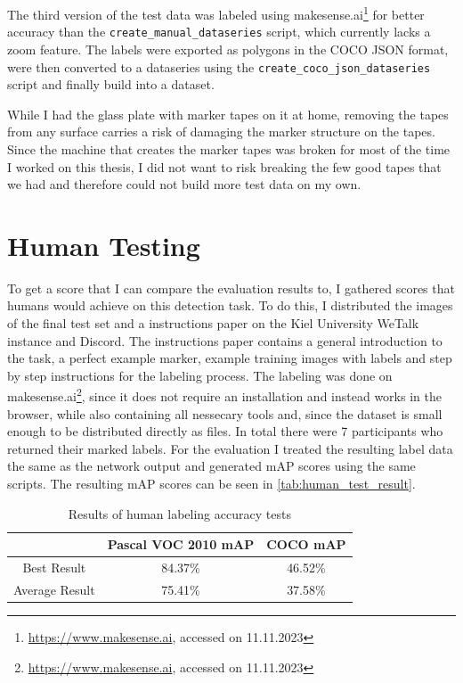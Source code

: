 \documentclass[10pt]{book}
\begin{document}
The third version of the test data was labeled using makesense.ai\footnote{\url{https://www.makesense.ai}, accessed on 11.11.2023} for better accuracy than the \texttt{create\_manual\_dataseries} script, which currently lacks a zoom feature. The labels were exported as polygons in the \ac{COCO} \ac{JSON} format, were then converted to a dataseries using the \texttt{create\_coco\_json\_dataseries} script and finally build into a dataset.

While I had the glass plate with marker tapes on it at home, removing the tapes from any surface carries a risk of damaging the marker structure on the tapes. Since the machine that creates the marker tapes was broken for most of the time I worked on this thesis, I did not want to risk breaking the few good tapes that we had and therefore could not build more test data on my own.

\section{Human Testing}

To get a score that I can compare the evaluation results to, I gathered scores that humans would achieve on this detection task. To do this, I distributed the images of the final test set and a instructions paper on the Kiel University WeTalk instance and Discord. The instructions paper contains a general introduction to the task, a perfect example marker, example training images with labels and step by step instructions for the labeling process. The labeling was done on makesense.ai\footnote{\url{https://www.makesense.ai}, accessed on 11.11.2023}, since it does not require an installation and instead works in the browser, while also containing all nessecary tools and, since the dataset is small enough to be distributed directly as files. In total there were 7 participants who returned their marked labels. For the evaluation I treated the resulting label data the same as the network output and generated \ac{mAP} scores using the same scripts. The resulting \ac{mAP} scores can be seen in \autoref{tab:human_test_result}.

\begin{table}
  \begin{tabular}{ c c c }
   & Pascal VOC 2010 \ac{mAP} & COCO \ac{mAP} \\ 
   \hline
   Best Result & 84.37\% & 46.52\% \\
   Average Result & 75.41\% & 37.58\% \\
   \hline
  \end{tabular}
  \caption{\label{tab:human_test_result}Results of human labeling accuracy tests}
\end{table}
\end{document}
